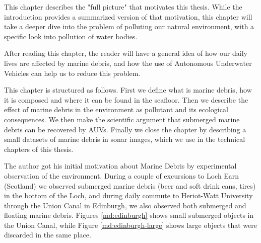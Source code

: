 This chapter describes the "full picture" that motivates this thesis. While the introduction provides a summarized version of that motivation, this chapter will take a deeper dive into the problem of polluting our natural environment, with a specific look into pollution of water bodies.

After reading this chapter, the reader will have a general idea of how our daily lives are affected by marine debris, and how the use of Autonomous Underwater Vehicles can help us to reduce this problem.

This chapter is structured as follows. First we define what is marine debris, how it is composed and where it can be found in the seafloor. Then we describe the effect of marine debris in the environment as pollutant and its ecological consequences. We then make the scientific argument that submerged marine debris can be recovered by AUVs. Finally we close the chapter by describing a small datasets of marine debris in sonar images, which we use in the technical chapters of this thesis.

The author got his initial motivation about Marine Debris by experimental observation of the environment. During a couple of excursions to Loch Earn (Scotland) we observed submerged marine debris (beer and soft drink cans, tires) in the bottom of the Loch, and during daily commute to Heriot-Watt University through the Union Canal in Edinburgh, we also observed both submerged and floating marine debris. Figures \ref{md:edinburgh} shows small submerged objects in the Union Canal, while Figure \ref{md:edinburgh-large} shows large objects that were discarded in the same place.

